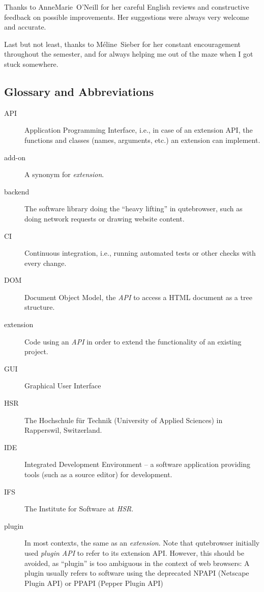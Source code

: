 \documentclass[a4paper,parskip=full]{scrreprt}
\begin{document}
Thanks to AnneMarie~O'Neill for her careful English reviews and constructive
feedback on possible improvements. Her suggestions were always very welcome and
accurate.

Last but not least, thanks to Méline~Sieber for her constant encouragement
throughout the semester, and for always helping me out of the maze when I got
stuck somewhere.



\begin{appendices}
\chapter{Glossary and Abbreviations}
\label{ch:glossary}
\begin{description}
  \item[API]{Application Programming Interface, i.e., in
      case of an extension API, the functions and classes (names, arguments,
      etc.) an extension can implement.}
  \item[add-on]{A synonym for \emph{extension}.}
  \item[backend]{The software library doing the ``heavy lifting'' in
      qutebrowser, such as doing network requests or drawing website content.}
  \item[CI]{Continuous integration, i.e., running automated tests or other
      checks with every change.}
  \item[DOM]{Document Object Model, the \emph{API} to access a HTML document as
      a tree structure.}
  \item[extension]{Code using an \emph{API} in order to extend the functionality
      of an existing project.}
  \item[GUI]{Graphical User Interface}
  \item[HSR]{The Hochschule für Technik (University of Applied Sciences) in
      Rapperswil, Switzerland.}
  \item[IDE]{Integrated Development Environment -- a software application
      providing tools (such as a source editor) for development.}
  \item[IFS]{The Institute for Software at \emph{HSR}.}
  \item[plugin]{In most contexts, the same as an \emph{extension}. Note that
      qutebrowser initially used \emph{plugin API} to refer to its extension
      API. However, this should be avoided, as ``plugin'' is too ambiguous in
      the context of web browsers: A plugin usually refers to software using the
      deprecated NPAPI (Netscape Plugin API) or PPAPI (Pepper Plugin API)
}
\end{description}
\end{appendices}
\end{document}
